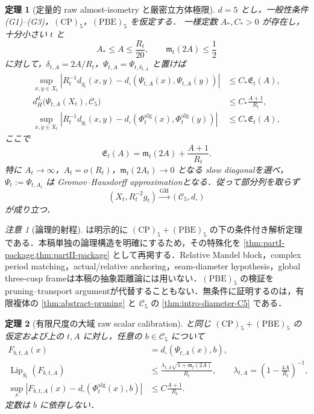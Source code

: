 \documentclass[a4paper,11pt]{ltjsarticle}
\numberwithin{equation}{section}
\theoremstyle{plain}
\newtheorem{theorem}{定理}[section]
\theoremstyle{definition}
\theoremstyle{remark}
\newtheorem{remark}[remark]{注意}
\newcommand{\cC}{\mathcal C}
\newcommand{\GH}{\mathrm{GH}}
\newcommand{\Lip}{\operatorname{Lip}}
\begin{document}
\begin{theorem}[定量的 raw almost-isometry と厳密立方体極限]
\label{thm:intro-exact}\label{main2:exact-limit}
$d=5$ とし，一般性条件 \textup{(G1)--(G3)}，$\mathrm{(CP)}_5$，$\mathrm{(PBE)}_5$ を仮定する．
一様定数 $A_*,C_*>0$ が存在し，十分小さい $t$ と
\[
 A_*\le A\le \frac{R_t}{20},
 \qquad
 \mathfrak m_t(2A)\le\frac12
\]
に対して，$\delta_{t,A}=2A/R_t$，$\Psi_{t,A}=\Psi_{t,\delta_{t,A}}$ と置けば
\begin{align}
 \sup_{x,y\in X_t}
 \left|R_t^{-1}d_{g_t}(x,y)
 -d_\square(\Psi_{t,A}(x),\Psi_{t,A}(y))\right|
 &\le C_*\mathfrak E_t(A),
 \label{eq:intro-quantitative-Psi}\\
 d_H^{d_\square}\bigl(\Psi_{t,A}(X_t),\cC_5\bigr)
 &\le C_*\frac{A+1}{R_t},
 \label{eq:intro-quantitative-density}\\
 \sup_{x,y\in X_t}
 \left|R_t^{-1}d_{g_t}(x,y)
 -d_\square(\Phi_t^{\mathrm{alg}}(x),\Phi_t^{\mathrm{alg}}(y))\right|
 &\le C_*\mathfrak E_t(A),
 \label{eq:intro-distortion}
\end{align}
ここで
\[
 \mathfrak E_t(A)=\mathfrak m_t(2A)+\frac{A+1}{R_t}.
\]
特に $A_t\to\infty$，$A_t=o(R_t)$，$\mathfrak m_t(2A_t)\to0$ となる slow diagonalを選べ，
$\Psi_t:=\Psi_{t,A_t}$ は Gromov--Hausdorff approximationとなる．従って部分列を取らず
\begin{equation}\label{eq:intro-GH}
 (X_t,R_t^{-2}g_t)\xrightarrow{\GH}(\cC_5,d_\square)
\end{equation}
が成り立つ．
\end{theorem}

\begin{remark}[論理的射程]\label{rem:relative-status}
 は明示的に $\mathrm{(CP)}_5+\mathrm{(PBE)}_5$ の下の条件付き解析定理である．本稿単独の論理構造を明確にするため，その特殊化を \cref{thm:partI-package,thm:partII-package} として再掲する．Relative Mandel block，complex period matching，actual/relative anchoring，seam-diameter hypothesis，global three-cusp frameは本稿の抽象距離論には用いない．$\mathrm{(PBE)}_5$ の検証を pruning--transport argumentが代替することもない．無条件に証明するのは，有限複体の \cref{thm:abstract-pruning} と $\cC_5$ の \cref{thm:intro-diameter-C5} である．
\end{remark}

\begin{theorem}[有限尺度の大域 raw scalar calibration]\label{thm:intro-scalar}
 と同じ $\mathrm{(CP)}_5+\mathrm{(PBE)}_5$ の仮定および上の $t,A$ に対し，任意の $b\in\cC_5$ について
\begin{align}
 F_{b,t,A}(x)&=d_\square(\Psi_{t,A}(x),b),\label{eq:intro-Fbt}\\
 \Lip_{g_t}(F_{b,t,A})
 &\le\frac{\lambda_{t,A}\sqrt{1+\mathfrak m_t(2A)}}{R_t},
 \qquad \lambda_{t,A}=\left(1-\frac{4A}{R_t}\right)^{-1},
 \label{eq:intro-F-lip}\\
 \sup_x\left|F_{b,t,A}(x)-d_\square(\Phi_t^{\mathrm{alg}}(x),b)\right|
 &\le C\frac{A+1}{R_t}.
 \label{eq:intro-F-value}
\end{align}
定数は $b$ に依存しない．
\end{theorem}
\end{document}
